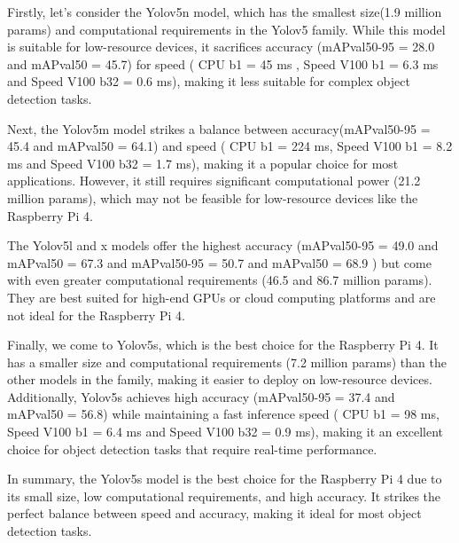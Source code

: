 Firstly, let's consider the Yolov5n model, which has the smallest size(1.9 million params) and computational requirements in the Yolov5 family. While this model is suitable for low-resource devices, it sacrifices accuracy (mAPval50-95 = 28.0 and mAPval50 =  45.7) for speed ( CPU b1 = 45 ms  , Speed V100 b1 = 6.3 ms and Speed V100 b32 = 	0.6 ms), making it less suitable for complex object detection tasks.

Next, the Yolov5m model strikes a balance between accuracy(mAPval50-95 = 45.4 and mAPval50 =  64.1) and speed ( CPU b1 = 224 ms, Speed V100 b1 = 8.2 ms and Speed V100 b32 = 1.7 ms), making it a popular choice for most applications. However, it still requires significant computational power (21.2 million params), which may not be feasible for low-resource devices like the Raspberry Pi 4.

The Yolov5l and x models offer the highest accuracy (mAPval50-95 = 49.0 and mAPval50 =  67.3 and mAPval50-95 = 50.7 and mAPval50 =  68.9 ) but come with even greater computational requirements (46.5 and 86.7 million params). They are best suited for high-end GPUs or cloud computing platforms and are not ideal for the Raspberry Pi 4.

Finally, we come to Yolov5s, which is the best choice for the Raspberry Pi 4. It has a smaller size and computational requirements (7.2 million params) than the other models in the family, making it easier to deploy on low-resource devices. Additionally, Yolov5s achieves high accuracy (mAPval50-95 = 37.4 and mAPval50 =  56.8) while maintaining a fast inference speed ( CPU b1 = 98 ms, Speed V100 b1 = 6.4 ms and Speed V100 b32 = 0.9 ms), making it an excellent choice for object detection tasks that require real-time performance.

In summary, the Yolov5s model is the best choice for the Raspberry Pi 4 due to its small size, low computational requirements, and high accuracy. It strikes the perfect balance between speed and accuracy, making it ideal for most object detection tasks.














%




%